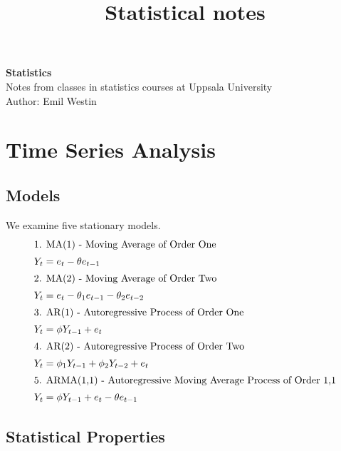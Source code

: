 \documentclass[11pt]{article}
\begin{document}
\title{Statistical notes}

\thispagestyle{empty}

\begin{center}
{\LARGE \bf Statistics}\\
Notes from classes in statistics courses at Uppsala University \\
Author: Emil Westin
\end{center}

\section{Time Series Analysis}
\subsection{Models}

We examine five stationary models.
\begin{align}
\intertext{1. MA(1) - Moving Average of Order One}
Y_t & = e_t - \theta e_{t-1} \label{MA1} \\
\intertext{2. MA(2) - Moving Average of Order Two}
Y_t & = e_t - \theta_1 e_{t-1} -  \theta_2 e_{t-2} \label{MA2} \\
\intertext{3. AR(1) - Autoregressive Process of Order One}
Y_t & = \phi Y_{t-1} + e_t \label{AR1} \\
\intertext{4. AR(2) - Autoregressive Process of Order Two}
Y_t & = \phi_1 Y_{t-1} + \phi_2 Y_{t-2} + e_t \label{AR2} \\
\intertext{5. ARMA(1,1) - Autoregressive Moving Average Process of Order 1,1}
Y_t & = \phi Y_{t-1} + e_t - \theta e_{t-1} \label{ARMA} 
\end{align}

\subsection{Statistical Properties}
\end{document}
